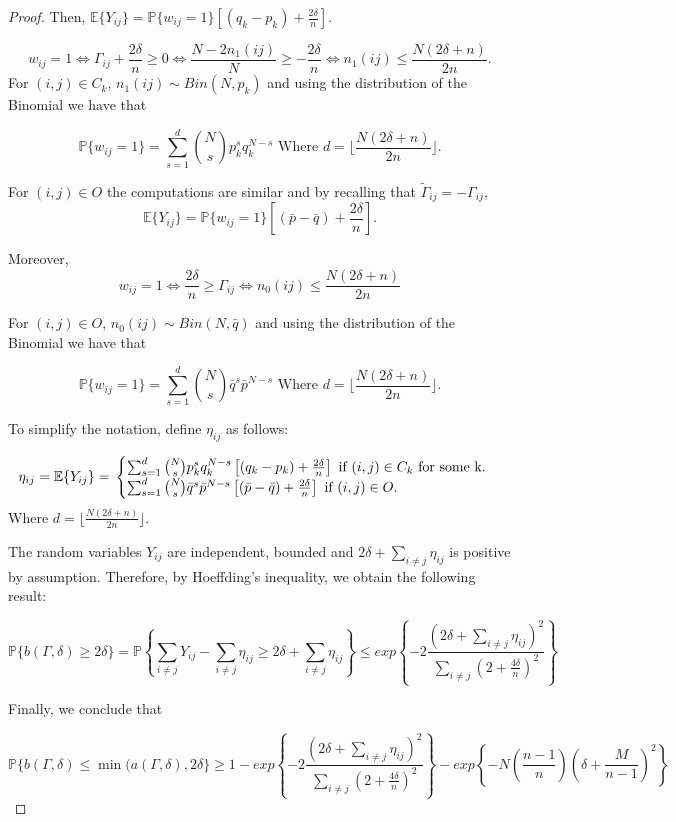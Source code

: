 \documentclass[12pt]{amsart}
\numberwithin{equation}{section}
\newcommand{\PP}{\mathbb{P}}
\newcommand{\EE}{\mathbb{E}}
\begin{document}
\begin{proof}
Then, $\EE\{Y_{ij}\} =\PP\{w_{ij}=1\}[(q_k-p_k)+\frac{2\delta}{n}]$.

\[
w_{ij} =1 \Leftrightarrow \Gamma_{ij} + \frac{2\delta}{n} \geq 0  \Leftrightarrow \frac{N-2n_1(ij)}{N} \geq -\frac{2\delta}{n} \Leftrightarrow n_1(ij) \leq \frac{N(2\delta+n)}{2n}.
\]
For $(i,j) \in C_k$, $n_1(ij)\sim Bin(N,p_k) $ and using the distribution of the Binomial we have that

\[
\PP\{w_{ij}=1\} = \sum_{s=1}^d \binom{N}{s}p_k^sq_k^{N-s} \text{   Where } d =  \lfloor\frac{N(2\delta+n)}{2n}\rfloor. 
\]




For $(i,j) \in O$ the computations are similar and by recalling that $\widetilde{\Gamma}_{ij} = -\Gamma_{ij}$,
\[
\EE\{Y_{ij}\} =\PP\{w_{ij}=1\} \left [(\bar{p}-\bar{q})+\frac{2\delta}{n}\right ].
\]

Moreover, 
\[
w_{ij}=1 \Leftrightarrow \frac{2\delta}{n} \geq \Gamma_{ij} \Leftrightarrow n_0(ij) \leq \frac{N(2\delta+n)}{2n}
\]

For $(i,j) \in O$, $n_0(ij)\sim Bin(N,\bar{q}) $ and using the distribution of the Binomial we have that

\[
\PP\{w_{ij}=1\} = \sum_{s=1}^d \binom{N}{s}\bar{q}^s\bar{p}^{N-s} \text{   Where } d =  \lfloor\frac{N(2\delta+n)}{2n}\rfloor. 
\]

To simplify the notation, define $\eta_{ij}$ as follows:

\[
\eta_{ij}=\EE\{Y_{ij}\}= {}\begin{cases}
\sum_{s=1}^d \binom{N}{s}p_k^sq_k^{N-s}\left [(q_k-p_k)+\frac{2\delta}{n}\right ] \text{ if } (i,j) \in C_k \text{ for some k}. \cr
\sum_{s=1}^d \binom{N}{s}\bar{q}^s\bar{p}^{N-s}\left [(\bar{p}-\bar{q})+\frac{2\delta}{n}\right ] \text{ if  }(i,j)\in O.
\end{cases}
\]
Where $d =  \lfloor\frac{N(2\delta+n)}{2n}\rfloor.$

The random variables $Y_{ij}$ are independent, bounded and $2\delta + \sum_{i\neq j}\eta_{ij}$ is positive by assumption. Therefore, by Hoeffding's inequality, we obtain the following result:

\[
\PP\{b(\Gamma,\delta)\geq 2\delta\} = \PP \left \{\sum_{i \neq j}Y_{ij}-\sum_{i \neq j}\eta_{ij} \geq 2\delta + \sum_{i\neq j}\eta_{ij}\right \} \leq exp \left \{-2 \frac{\left (2\delta + \sum_{i\neq j}\eta_{ij}\right )^2}{\sum_{i\neq j}(2+\frac{4\delta}{n})^2}     \right \} 
\]


Finally, we conclude that

\[
\PP\{b(\Gamma,\delta) \leq \min(a(\Gamma,\delta),2\delta \} \geq 1- exp \left \{-2 \frac{\left (2\delta + \sum_{i\neq j}\eta_{ij}\right )^2}{\sum_{i\neq j}(2+\frac{4\delta}{n})^2}     \right \} - 
exp\left\{-N \left ( \frac{n-1}{n} \right ) \left (\delta +\frac{M}{n-1}\right )^2 \right\}
\]
\end{proof}
\end{document}
